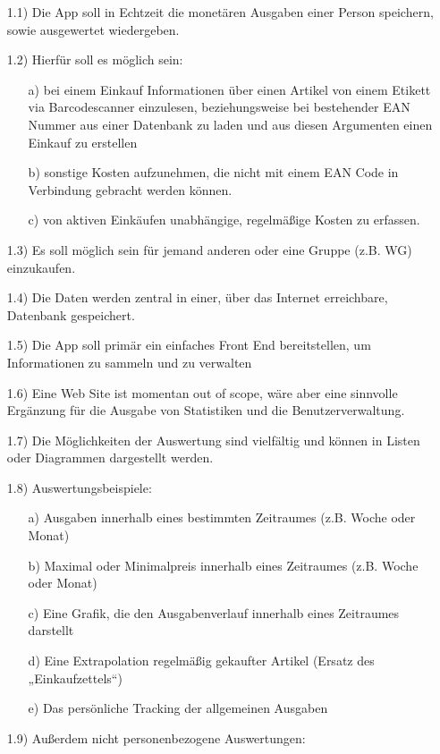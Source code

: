\documentclass[12pt,a4paper]{article}
\begin{document}
\begin{itemize}
 \item[1.1)] 
  Die App soll in Echtzeit die monetären Ausgaben einer Person speichern, sowie ausgewertet wiedergeben.
 \item[1.2)] Hierfür soll es möglich sein:
 \begin{itemize}
 \item[a)] bei einem Einkauf Informationen über einen Artikel von einem Etikett via Barcodescanner einzulesen, beziehungsweise bei bestehender EAN Nummer aus einer Datenbank zu laden und aus diesen Argumenten einen Einkauf zu erstellen
  \item[b)] sonstige Kosten aufzunehmen, die nicht mit einem EAN Code in Verbindung gebracht werden können.
  \item[c)] von aktiven Einkäufen unabhängige, regelmäßige Kosten zu erfassen.
  \end{itemize}
 \item[1.3)] Es soll möglich sein für jemand anderen oder eine Gruppe (z.B. WG) einzukaufen.
 \item[1.4)] Die Daten werden zentral in einer, über das Internet erreichbare, Datenbank gespeichert.
 \item[1.5)] Die App soll primär ein einfaches Front End bereitstellen, um Informationen zu sammeln und zu verwalten
 \item[1.6)] Eine Web Site ist momentan out of scope, wäre aber eine sinnvolle Ergänzung für die Ausgabe von Statistiken und die Benutzerverwaltung.
 \item[1.7)] Die Möglichkeiten der Auswertung sind vielfältig und können in Listen oder Diagrammen dargestellt werden.
 \item[1.8)] Auswertungsbeispiele:
 \begin{itemize}
\item[a)]Ausgaben innerhalb eines bestimmten Zeitraumes (z.B. Woche oder Monat)
 \item[b)] Maximal oder Minimalpreis innerhalb eines Zeitraumes (z.B. Woche oder Monat) 
\item[c)] Eine Grafik, die den Ausgabenverlauf innerhalb eines Zeitraumes darstellt
\item[d)] Eine Extrapolation regelmäßig gekaufter Artikel (Ersatz des „Einkaufzettels“)
\item[e)]Das persönliche Tracking der allgemeinen Ausgaben
\end{itemize}
 \item[1.9)] Außerdem nicht personenbezogene Auswertungen:

\end{itemize}
\end{document}
